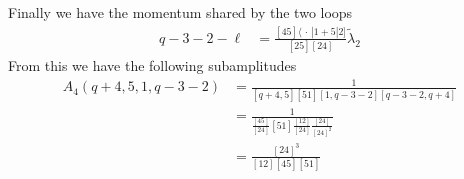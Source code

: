 \documentclass[letter,11pt]{article}
\newcommand{\aMs}[3]{\langle #1|#2|#3]}  		%
\begin{document}
Finally we have the momentum shared by the two loops
\begin{equation}
	\begin{aligned}
	q-3-2-\ell&=\frac{\left[45\right]\aMs{\,\cdot\,}{1+5}{2}}{\left[25\right]\left[24\right]}\tilde\lambda_2	
	\end{aligned}
\end{equation}
From this we have the following subamplitudes
\begin{equation}
	\begin{aligned}
		A_4(q+4,5,1,q-3-2)&=\frac{1}{\left[q+4,5\right]\left[51\right]\left[1,q-3-2\right]\left[q-3-2,q+4\right]}\\
		&=\frac{1}{\frac{\left[45\right]}{\left[24\right]}\left[51\right]\frac{\left[12\right]}{\left[24\right]}\frac{\left[24\right]}{\left[24\right]^2}}\\
		&=\frac{[24]^3}{[12]\left[45\right][51]}
	\end{aligned}
\end{equation}
\end{document}

